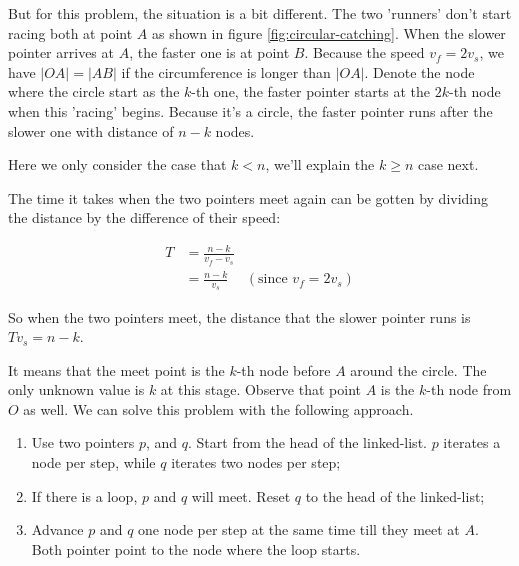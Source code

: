 \documentclass{article}
\begin{document}
But for this problem, the situation is a bit different. The two 'runners' don't
start racing both at point $A$ as shown in figure \ref{fig:circular-catching}.
When the slower pointer arrives
at $A$, the faster one is at point $B$. Because the speed $v_f = 2v_s$, we have
$|OA| = |AB|$ if the circumference is longer than $|OA|$.
Denote the node where the circle start as the $k$-th one, the
faster pointer starts at the $2k$-th node when this 'racing' begins. Because it's
a circle, the faster pointer runs after the slower one with distance of $n-k$ nodes.

Here we only consider the case that $k < n$, we'll explain the $k \geq n$ case next.

The time it takes when the two pointers meet again can be gotten by dividing the distance by
the difference of their speed:

\begin{equation}
\begin{array}{rlr}
T & = \displaystyle \frac{n-k}{v_f - v_s} & \\
  & = \displaystyle \frac{n-k}{v_s} & (\textrm{since } v_f = 2v_s)
\end{array}
\end{equation}

So when the two pointers meet, the distance that the slower pointer runs is $Tv_s = n - k$.

It means that the meet point is the $k$-th node before $A$ around the circle.
The only unknown value
is $k$ at this stage. Observe that point $A$ is the $k$-th node from $O$ as well.
We can solve this problem with the following approach.

\begin{enumerate}
\item Use two pointers $p$, and $q$. Start from the head of the linked-list. $p$ iterates
a node per step, while $q$ iterates two nodes per step;
\item If there is a loop, $p$ and $q$ will meet. Reset $q$ to the head of the linked-list;
\item Advance $p$ and $q$ one node per step at the same time till they meet at $A$. Both
pointer point to the node where the loop starts.
\end{enumerate}
\end{document}
